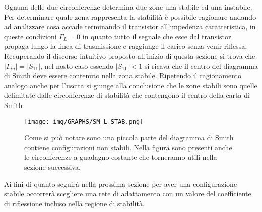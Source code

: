 \documentclass[12pt,oneside]{book}
\begin{document}
Ognuna delle due circonferenze determina due zone una stabile ed una instabile. Per determinare quale zona rappresenta la stabilità è possibile ragionare andando ad analizzare cosa accade terminando il transistor all'impedenza caratteristica, in queste condizioni $\Gamma_{L}=0$ in quanto tutto il segnale che esce dal transistor propaga lungo la linea di trasmissione e raggiunge il carico senza venir riflessa. Recuperando il discorso intuitivo proposto all'inizio di questa sezione si trova che $|\Gamma_{in}|=|S_{11}|$, nel nosto caso essendo $|S_{11}|<1$ si ricava che il centro del diagramma di Smith deve essere contenuto nella zona stabile. Ripetendo il ragionamento analogo anche per l'uscita si giunge alla conclusione che le zone stabili sono quelle delimitate dalle circonferenze di stabilità che contengono il centro della carta di Smith


\begin{figure}[!htbp]
    \centering
        \texttt{[image: img/GRAPHS/SM\_L\_STAB.png]}
        \caption{Come si può notare sono una piccola parte del diagramma di Smith contiene configurazioni non stabili. Nella figura sono presenti anche le circonferenze a guadagno costante che torneranno utili nella sezione successiva.}
\end{figure}

Ai fini di quanto seguirà nella prossima sezione per aver una configurazione stabile occorrerà scegliere una rete di adattamento con un valore del coefficiente di riflessione incluso nella regione di stabilità.
\end{document}
